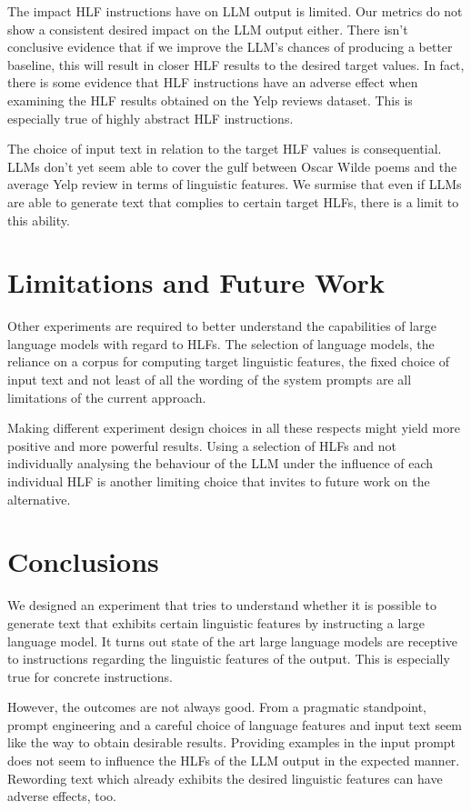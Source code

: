\documentclass[a4paper,twoside]{article}
\begin{document}
The impact HLF instructions have on LLM output is limited.
Our metrics do not show a consistent desired impact on the LLM output either.
There isn't conclusive evidence that if we improve the LLM's chances of
producing a better baseline, this will result in closer HLF results to the 
desired target values.\@
In fact, there is some evidence that HLF instructions have an adverse effect
when examining the HLF results obtained on the Yelp reviews dataset.
This is especially true of highly abstract HLF instructions.

The choice of input text in relation to the target HLF values is consequential.
LLMs don't yet seem able to cover the gulf between Oscar Wilde poems and the
average Yelp review in terms of linguistic features.
We surmise that even if LLMs are able to generate text that complies to certain
target HLFs, there is a limit to this ability.

\section{Limitations and Future Work}

Other experiments are required to better understand the capabilities of large
language models with regard to HLFs.
The selection of language models, the reliance on a corpus for computing target
linguistic features, the fixed choice of input text and not least of all the
wording of the system prompts are all limitations of the current approach.

Making different experiment design choices in all these respects might yield
more positive and more powerful results.
Using a selection of HLFs and not individually analysing the behaviour of the
LLM under the influence of each individual HLF is another limiting choice that
invites to future work on the alternative.

\section{Conclusions}

We designed an experiment that tries to understand whether it is possible to
generate text that exhibits certain linguistic features by instructing a large
language model.
It turns out state of the art large language models are receptive to
instructions regarding the linguistic features of the output.
This is especially true for concrete instructions.

However, the outcomes are not always good.
From a pragmatic standpoint, prompt engineering and a careful choice of language
features and input text seem like the way to obtain desirable results.
Providing examples in the input prompt does not seem to influence the HLFs of
the LLM output in the expected manner.
Rewording text which already exhibits the desired linguistic features can have
adverse effects, too.
\end{document}
